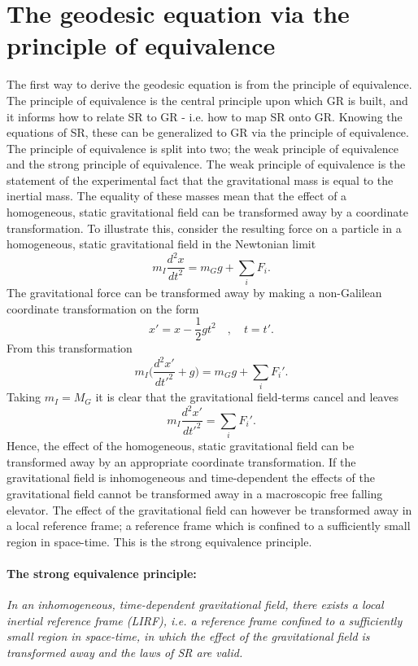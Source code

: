 \section{The geodesic equation via the principle of equivalence}
The first way to derive the geodesic equation is from the principle of equivalence. The principle of equivalence is the central principle upon which GR is built, and it informs how to relate SR to GR - i.e. how to map SR onto GR. Knowing the equations of SR, these can be generalized to GR via the principle of equivalence. The principle of equivalence is split into two; the weak principle of equivalence and the strong principle of equivalence. The weak principle of equivalence is the statement of the experimental fact that the gravitational mass is equal to the inertial mass. The equality of these masses mean that the effect of a homogeneous, static gravitational field can be transformed away by a coordinate transformation. To illustrate this, consider the resulting force on a particle in a homogeneous, static gravitational field in the Newtonian limit
\begin{equation}
	m_I\frac{d^2x}{dt^2}=m_Gg+\sum_iF_i.
\end{equation} 
The gravitational force can be transformed away by making a non-Galilean coordinate transformation on the form
\begin{equation}
	x'=x-\frac{1}{2}gt^2 \quad, \quad t=t'.
\end{equation} 
From this transformation
\begin{equation}
	m_I\bigg(\frac{d^2x'}{dt'^2}+g\bigg)=m_Gg+\sum_iF_i'.
\end{equation} 
Taking $m_I=M_G$ it is clear that the gravitational field-terms cancel and leaves
\begin{equation}
	m_I\frac{d^2x'}{dt'^2}=\sum_iF_i'.
\end{equation} 
Hence, the effect of the homogeneous, static gravitational field can be transformed away by an appropriate coordinate transformation. If the gravitational field is inhomogeneous and time-dependent the effects of the gravitational field cannot be transformed away in a macroscopic free falling elevator. The effect of the gravitational field can however be transformed away in a local reference frame; a reference frame which is confined to a sufficiently small region in space-time. This is the strong equivalence principle. 
\paragraph{The strong equivalence principle:} \emph{In an inhomogeneous, time-dependent gravitational field, there exists a local inertial reference frame (LIRF), i.e. a reference frame confined to a sufficiently small region in space-time, in which the effect of the gravitational field is transformed away and the laws of SR are valid. }\newline

